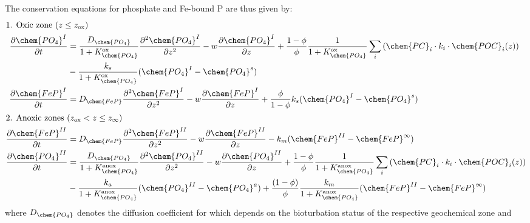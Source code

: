 \documentclass[gmd, manuscript]{copernicus}
\begin{document}
The conservation equations for phosphate and Fe-bound P are thus given by:
\begin{align}
\intertext{1. Oxic zone ($z \leq z_{\mathrm{ox}}$)}
 \frac{\partial \chem{PO_4}^I}{\partial t} &= \frac{D_{\chem{PO_4}}}{1+K_\chem{PO_4}^{\mathrm{ox}}} \frac{\partial^2\chem{PO_4}^I }{\partial z^2} - w\frac{\partial \chem{PO_4}^I }{\partial z} + \frac{1-\phi}{\phi}\frac{1}{1+K_\chem{PO_4}^{\mathrm{ox}}}\sum_i 
					\left( \chem{PC}_i \cdot k_i \cdot \chem{POC}_{i}(z) \right) \notag\\
					& - \frac{k_{s}}{1+K_\chem{PO_4}^{\mathrm{ox}}}(\chem{PO_4}^I-\chem{PO_4}^s)\label{eq:PO4_ODE_L1}\\  %
 \frac{\partial \chem{FeP}^I}{\partial t} &= D_{\chem{FeP}}\frac{\partial^2\chem{FeP}^I }{\partial z^2} - w\frac{\partial \chem{FeP}^I }{\partial z} + \frac{\phi}{1-\phi}k_{s}(\chem{PO_4}^I-\chem{PO_4}^s)\label{eq:M_ODE_L1}\\  
 \intertext{2. Anoxic zones ($z_{\mathrm{ox}} < z \leq z_{\infty}$)} 
 \frac{\partial \chem{FeP}^{II}}{\partial t} & = D_{\chem{FeP}}\frac{\partial^2\chem{FeP}^{II} }{\partial z^2} - w\frac{\partial \chem{FeP}^{II} }{\partial z} - k_{m}(\chem{FeP}^{II} - \chem{FeP}^\infty)\label{eq:M_ODE_L2}\\  
 \frac{\partial \chem{PO_4}^{II}}{\partial t} &= \frac{D_{\chem{PO_4}}}{1+K_\chem{PO_4}^{\mathrm{anox}}} \frac{\partial^2\chem{PO_4}^{II} }{\partial z^2} - w\frac{\partial \chem{PO_4}^{II} }{\partial z} + \frac{1-\phi}{\phi} \frac{1}{1+K_\chem{PO_4}^{\mathrm{anox}}}\sum_i 
					\left( \chem{PC}_i \cdot k_i \cdot \chem{POC}_{i}(z) \right) \notag\\
					& - \frac{k_{a}}{1+K_\chem{PO_4}^{\mathrm{anox}}}(\chem{PO_4}^{II}-\chem{PO_4}^a) + \frac{(1-\phi)}{\phi}\frac{k_{m}}{1+K_\chem{PO_4}^{\mathrm{anox}}}(\chem{FeP}^{II}-\chem{FeP}^\infty)\label{eq:PO4_ODE_L2}
\end{align}
where $D_\chem{PO_4}$ denotes the diffusion coefficient for  which depends on the bioturbation status of the respective geochemical zone and 
\end{document}
